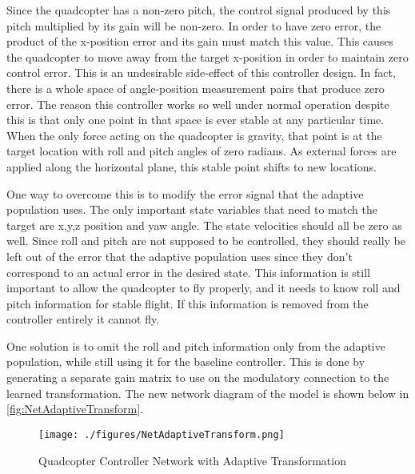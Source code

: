 \documentclass[letterpaper,12pt,titlepage,oneside,final]{book}
\begin{document}

Since the quadcopter has a non-zero pitch, the control signal produced by this pitch multiplied by its gain will be non-zero. 
In order to have zero error, the product of the x-position error and its gain must match this value. 
This causes the quadcopter to move away from the target x-position in order to maintain zero control error. 
This is an undesirable side-effect of this controller design. 
In fact, there is a whole space of angle-position measurement pairs that produce zero error. 
The reason this controller works so well under normal operation despite this is that only one point in that space is ever stable at any particular time. 
When the only force acting on the quadcopter is gravity, that point is at the target location with roll and pitch angles of zero radians. 
As external forces are applied along the horizontal plane, this stable point shifts to new locations.


One way to overcome this is to modify the error signal that the adaptive population uses. 
The only important state variables that need to match the target are x,y,z position and yaw angle. 
The state velocities should all be zero as well. 
Since roll and pitch are not supposed to be controlled, they should really be left out of the error that the adaptive population uses since they don’t correspond to an actual error in the desired state. 
This information is still important to allow the quadcopter to fly properly, and it needs to know roll and pitch information for stable flight. If this information is removed from the controller entirely it cannot fly.

One solution is to omit the roll and pitch information only from the adaptive population, while still using it for the baseline controller. 
This is done by generating a separate gain matrix to use on the modulatory connection to the learned transformation. 
The new network diagram of the model is shown below in \autoref{fig:NetAdaptiveTransform}.

\begin{figure}
\centering
\texttt{[image: ./figures/NetAdaptiveTransform.png]} %
\caption{Quadcopter Controller Network with Adaptive Transformation}
\label{fig:NetAdaptiveTransform}
\end{figure}
\end{document}
